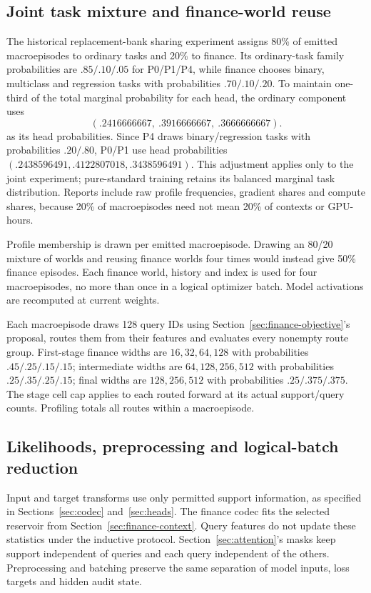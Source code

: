 \documentclass[11pt]{article}
\begin{document}
\subsection{Joint task mixture and finance-world reuse}
\label{sec:mixture}

The historical replacement-bank sharing experiment assigns 80\% of emitted macroepisodes to ordinary tasks and 20\% to finance. Its ordinary-task family probabilities are $.85/.10/.05$ for P0/P1/P4, while finance chooses binary, multiclass and regression tasks with probabilities $.70/.10/.20$. To maintain one-third of the total marginal probability for each head, the ordinary component uses
\[
(.2416666667,\ .3916666667,\ .3666666667).
\]
as its head probabilities. Since P4 draws binary/regression tasks with probabilities $.20/.80$, P0/P1 use head probabilities $(.2438596491,.4122807018,.3438596491)$. This adjustment applies only to the joint experiment; pure-standard training retains its balanced marginal task distribution. Reports include raw profile frequencies, gradient shares and compute shares, because 20\% of macroepisodes need not mean 20\% of contexts or GPU-hours.

Profile membership is drawn per emitted macroepisode. Drawing an 80/20 mixture of worlds and reusing finance worlds four times would instead give 50\% finance episodes. Each finance world, history and index is used for four macroepisodes, no more than once in a logical optimizer batch. Model activations are recomputed at current weights.

Each macroepisode draws 128 query IDs using Section~\ref{sec:finance-objective}'s proposal, routes them from their features and evaluates every nonempty route group. First-stage finance widths are $16,32,64,128$ with probabilities $.45/.25/.15/.15$; intermediate widths are $64,128,256,512$ with probabilities $.25/.35/.25/.15$; final widths are $128,256,512$ with probabilities $.25/.375/.375$. The stage cell cap applies to each routed forward at its actual support/query counts. Profiling totals all routes within a macroepisode.

\subsection{Likelihoods, preprocessing and logical-batch reduction}
\label{sec:training-loss}

Input and target transforms use only permitted support information, as specified in Sections~\ref{sec:codec} and~\ref{sec:heads}. The finance codec fits the selected reservoir from Section~\ref{sec:finance-context}. Query features do not update these statistics under the inductive protocol. Section~\ref{sec:attention}'s masks keep support independent of queries and each query independent of the others. Preprocessing and batching preserve the same separation of model inputs, loss targets and hidden audit state.
\end{document}
